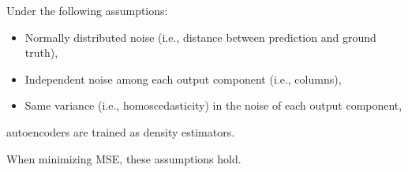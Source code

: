 \begin{theorem}
    Under the following assumptions:
    \begin{itemize}
        \item Normally distributed noise (i.e., distance between prediction and ground truth),
        \item Independent noise among each output component (i.e., columns),
        \item Same variance (i.e., homoscedasticity) in the noise of each output component,
    \end{itemize}
    autoencoders are trained as density estimators.

    \begin{remark}
        When minimizing MSE, these assumptions hold.
    \end{remark}


\end{theorem}
